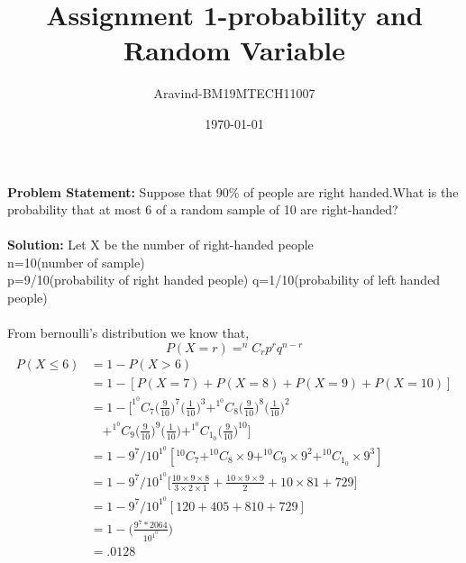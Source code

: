 \documentclass[11pt,a4paper,twocolumn]{article}
\title{Assignment 1-probability and Random Variable}
\author{Aravind-BM19MTECH11007}
\date{\today}
\begin{document}
\maketitle
\textbf{Problem Statement:} Suppose that 90\% of people are right handed.What is the probability that at most 6 of a random sample of 10 are right-handed?
\\
\\

\textbf{Solution:} Let X be the number of right-handed people
\\
n=10(number of sample)
\\
p=9/10(probability of right handed people)
q=1/10(probability of left handed people)
\\
\\
From bernoulli's distribution we know that,
\begin{equation}
    P(X=r)=^{n}C_rp^{r}q^{n-r}
\end{equation}
\begin{equation}
\begin{split}
    P(X\le6) & =1-P(X>6)
             \\ &  =1-[P(X=7)+P(X=8)+P(X=9)+P(X=10)]
            \\ &    =1-[^1^0C_7\Bigg(\frac{9}{10}\Bigg)^{7}\Bigg(\frac{1}{10}\Bigg)^3+^1^0C_8\Bigg(\frac{9}{10}\Bigg)^8\Bigg(\frac{1}{10}\Bigg)^2\\
            &\quad+^1^0C_9\Bigg(\frac{9}{10}\Bigg)^9\Bigg(\frac{1}{10}\Bigg)+^1^0C_1_0\Bigg(\frac{9}{10}\Bigg)^{10}]
            \\&
            =1-9^7/10^1^0[^{10}C_7+^{10}C_8\times9+
            ^{10}C_9\times9^2+^{10}C_1_0\times9^3]
            \\&
            =1-9^7/10^1^0\Bigg[\frac{10\times9\times8}{3\times2\times1}+\frac{10\times9\times9}{2}+10\times81+729\Bigg]
            \\&
            =1-9^7/10^1^0[120+405+810+729]
            \\&
            =1-\Bigg(\frac{9^7*2064}{10^1^0}\Bigg)
            \\ &
            =.0128
\end{split}
\end{equation}
\end{document}
